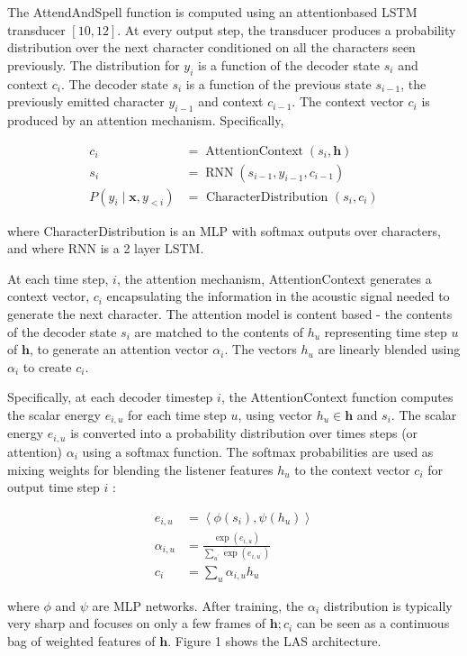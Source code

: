 The AttendAndSpell function is computed using an attentionbased LSTM transducer $[10,12]$. At every output step, the transducer produces a probability distribution over the next character conditioned on all the characters seen previously. The distribution for $y_{i}$ is a function of the decoder state $s_{i}$ and context $c_{i}$. The decoder state $s_{i}$ is a function of the previous state $s_{i-1}$, the previously emitted character $y_{i-1}$ and context $c_{i-1}$. The context vector $c_{i}$ is produced by an attention mechanism. Specifically,

$$
\begin{aligned}
c_{i} &=\operatorname{AttentionContext}\left(s_{i}, \mathbf{h}\right) \\
s_{i} &=\operatorname{RNN}\left(s_{i-1}, y_{i-1}, c_{i-1}\right) \\
P\left(y_{i} \mid \mathbf{x}, y_{<i}\right) &=\text { CharacterDistribution }\left(s_{i}, c_{i}\right)
\end{aligned}
$$

where CharacterDistribution is an MLP with softmax outputs over characters, and where RNN is a 2 layer LSTM.

At each time step, $i$, the attention mechanism, AttentionContext generates a context vector, $c_{i}$ encapsulating the information in the acoustic signal needed to generate the next character. The attention model is content based - the contents of the decoder state $s_{i}$ are matched to the contents of $h_{u}$ representing time step $u$ of $\mathbf{h}$, to generate an attention vector $\alpha_{i}$. The vectors $h_{u}$ are linearly blended using $\alpha_{i}$ to create $c_{i}$.

Specifically, at each decoder timestep $i$, the AttentionContext function computes the scalar energy $e_{i, u}$ for each time step $u$, using vector $h_{u} \in \mathbf{h}$ and $s_{i}$. The scalar energy $e_{i, u}$ is converted into a probability distribution over times steps (or attention) $\alpha_{i}$ using a softmax function. The softmax probabilities are used as mixing weights for blending the listener features $h_{u}$ to the context vector $c_{i}$ for output time step $i$ :

$$
\begin{aligned}
e_{i, u} &=\left\langle\phi\left(s_{i}\right), \psi\left(h_{u}\right)\right\rangle \\
\alpha_{i, u} &=\frac{\exp \left(e_{i, u}\right)}{\sum_{u^{\prime}} \exp \left(e_{i, u^{\prime}}\right)} \\
c_{i} &=\sum_{u} \alpha_{i, u} h_{u}
\end{aligned}
$$

where $\phi$ and $\psi$ are MLP networks. After training, the $\alpha_{i}$ distribution is typically very sharp and focuses on only a few frames of $\mathbf{h} ; c_{i}$ can be seen as a continuous bag of weighted features of $\mathbf{h}$. Figure 1 shows the LAS architecture.
